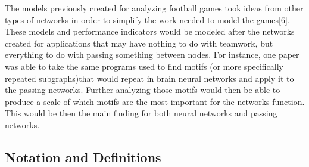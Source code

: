 \documentclass{mcmthesis}
\begin{document}
The models previously created for analyzing football games took ideas from other types of networks in order to simplify the work needed to model the games[6].
These models and performance indicators would be modeled after the networks created for applications that may have nothing to do with teamwork, but everything to do with passing something between nodes.
For instance, one paper was able to take the same programs used to find motifs (or more specifically repeated subgraphs)that would repeat in brain neural networks and apply it to the passing networks. 
Further analyzing those motifs would then be able to produce a scale of which motifs are the most important for the networks function.
This would be then the main finding for both neural networks and passing networks. 

\subsection{ Notation and Definitions }
\end{document}
